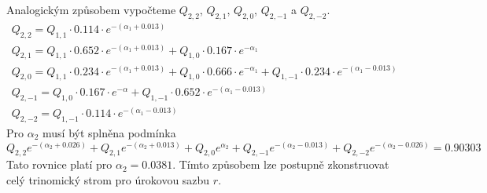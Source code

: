 \documentclass[a4paper]{book}
\begin{document}
Analogickým způsobem vypočteme $Q_{2,2}$, $Q_{2,1}$, $Q_{2,0}$, $Q_{2,-1}$ a $Q_{2,-2}$.
\begin{gather*}
Q_{2,2} = Q_{1,1} \cdot 0.114 \cdot e^{-(\alpha_1 + 0.013)} \\
Q_{2,1} = Q_{1,1} \cdot 0.652 \cdot e^{-(\alpha_1 + 0.013)}  + Q_{1,0} \cdot 0.167 \cdot e^{-\alpha_1}\\
Q_{2,0} = Q_{1,1} \cdot 0.234 \cdot e^{-(\alpha_1 + 0.013)}  + Q_{1,0} \cdot 0.666 \cdot e^{-\alpha_1} + Q_{1,-1} \cdot 0.234 \cdot e^{-(\alpha_1 - 0.013)}\\
Q_{2,-1} = Q_{1,0} \cdot 0.167 \cdot e^{-\alpha}  + Q_{1,-1} \cdot 0.652 \cdot e^{-(\alpha_1 - 0.013)}\\
Q_{2,-2} = Q_{1,-1} \cdot 0.114 \cdot e^{-(\alpha_1 - 0.013)}
\end{gather*}
Pro $\alpha_2$ musí být splněna podmínka
\begin{equation*}
Q_{2,2}e^{-(\alpha_2 + 0.026)} + Q_{2,1}e^{-(\alpha_2 + 0.013)} + Q_{2,0}e^{\alpha_2} + Q_{2,-1}e^{-(\alpha_2 - 0.013)} + Q_{2,-2}e^{-(\alpha_2 - 0.026)} = 0.90303
\end{equation*}
Tato rovnice platí pro $\alpha_2 = 0.0381$. Tímto způsobem lze postupně zkonstruovat celý trinomický strom pro úrokovou sazbu $r$.
\end{document}
